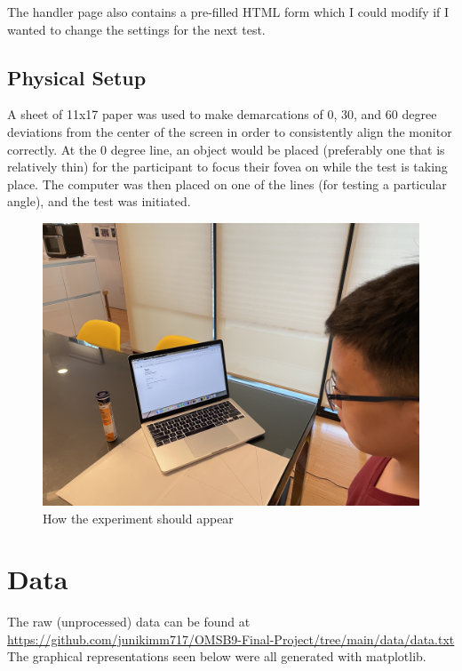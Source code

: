 \documentclass[12pt]{article}
\begin{document}
The handler page also contains a pre-filled HTML form which I could
modify if I wanted to change the settings for the next test.

\subsection{Physical Setup}
A sheet of 11x17 paper was used to make demarcations of 0, 30, and 60 degree
deviations from the center of the screen in order to consistently align the
monitor correctly. At the 0 degree line, an object would be placed (preferably
one that is relatively thin) for the participant to focus their fovea
on while the test is taking place.  The computer was then placed on one of the
lines (for testing a particular angle), and the test was initiated.


\begin{figure}
\centering
\includegraphics[scale=0.3]{diagram.JPG}
\caption{How the experiment should appear}
\end{figure}

\section{Data}
The raw (unprocessed) data can be found at \\
\url{https://github.com/junikimm717/OMSB9-Final-Project/tree/main/data/data.txt}
The graphical representations seen below were all generated with matplotlib.
\end{document}
